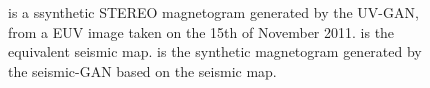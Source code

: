 \documentclass[11pt,a4paper,onecolumn]{report}
\begin{document}
\begin{figure}[t]%
  \centering
  \caption[]{ is a ssynthetic STEREO magnetogram
  generated by the UV-GAN, from a EUV image taken on the 15th of November 2011.
   is the equivalent seismic map.
   is the synthetic magnetogram generated by the
  seismic-GAN based on the seismic map.}
  \label{fig:seismic_2011_11_15}
\end{figure}
\end{document}
